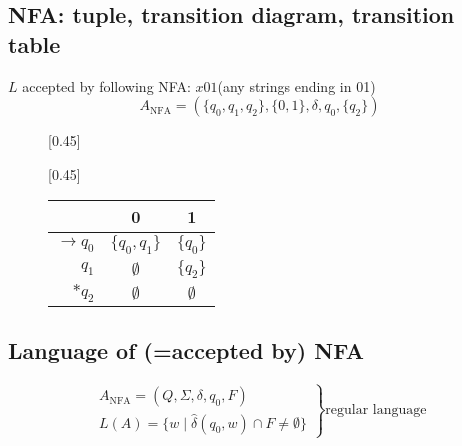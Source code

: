 \documentclass[10pt,a4paper,landscape]{article}
\newcommand{\gor}{\;|\;}
\begin{document}
\begin{multicols*}{3}
\subsection*{NFA: tuple, transition diagram, transition table}
{\footnotesize\(L\) accepted by following NFA: \(x01\)\hfill (any strings ending in 01)}
\vspace{-0.5em}
{\footnotesize
  \[
A_{\text{NFA}} = (\{q_{0},q_{1},q_{2}\},\{0,1\},\delta,q_{0},\{q_{2}\})
  \]
}
\begin{figure}[H]
  \centering
{\footnotesize
  [0.45\linewidth]{
}
}
{\footnotesize
{}
[0.45\linewidth]{
\begin{tabular}{r||c|c}
   & 0 & 1 \\
  \hline
  \(\rightarrow q_{0}\) & \(\{q_{0},q_{1}\}\) & \(\{q_{0}\}\)\\
  \(q_{1}\) & \(\emptyset\) & \(\{q_{2}\}\)\\
  \(*q_{2}\) & \(\emptyset\) & \(\emptyset\)\\
  \hline
\end{tabular}}
}
\end{figure}



\subsection*{Language of (=accepted by) NFA}
\vspace{0.5em}
\[\left.
    \begin{array}{l}
    A_{\text{NFA}} = (Q,\Sigma,\delta,q_{0},F)\\
    L(A) = \{w \gor \hat{\delta}(q_{0},w) \cap F \neq \emptyset\}
    \end{array}
    \right\} \text{regular language}
\]



\end{multicols*}
\end{document}
